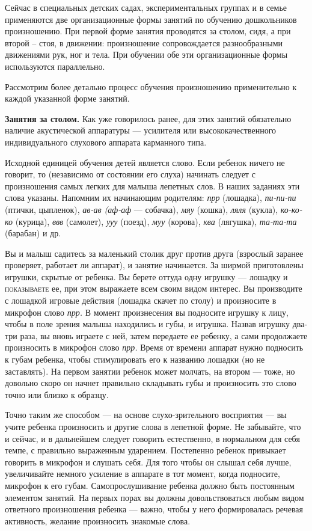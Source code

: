 \documentclass{book}
\renewcommand{\emph}[1]{\textit{#1}}
\begin{document}
Сейчас в специальных детских садах, экспериментальных группах и в семье
применяются две организационные формы занятий по обучению дошкольников
произношению. При первой форме занятия проводятся за столом, сидя, а при
второй -- стоя, в движении: произношение сопровождается разнообразными
движениями рук, ног и тела. При обучении обе эти организационные формы
используются параллельно.

Рассмотрим более детально процесс обучения произношению применительно к
каждой указанной форме занятий.

\textbf{Занятия за столом.} Как уже говорилось ранее, для этих занятий
обязательно наличие акустической аппаратуры --- усилителя или
высококачественного индивидуального слухового аппарата карманного типа.

Исходной единицей обучения детей является слово. Если ребенок ничего не
говорит, то (независимо от состоянии его слуха) начинать следует с
произношения самых легких для малыша лепетных слов. В наших заданиях эти
слова указаны. Напомним их начинающим родителям: \emph{прр} (лошадка),
\emph{пи-пи-пи} (птички, цыпленок), \emph{ав-ав (аф-аф} --- собачка),
\emph{мяу} (кошка), \emph{ляля} (кукла), \emph{ко-ко-ко} (курица),
\emph{ввв} (самолет), \emph{ууу} (поезд), \emph{муу} (корова),
\emph{ква} (лягушка), \emph{та-та-та} (барабан) и др.

Вы и малыш садитесь за маленький столик друг против друга (взрослый
заранее проверяет, работает ли аппарат), и занятие начинается. За ширмой
приготовлены игрушки, скрытые от ребенка. Вы берете оттуда одну игрушку
--- лошадку и \textsc{показываете} ее, при этом выражаете всем своим
видом интерес. Вы производите с лошадкой игровые действия (лошадка
скачет по столу) и произносите в микрофон слово \emph{прр.} В момент
произнесения вы подносите игрушку к лицу, чтобы в поле зрения малыша
находились и губы, и игрушка. Назвав игрушку два-три раза, вы вновь
играете с ней, затем передаете ее ребенку, а сами продолжаете
произносить в микрофон слово \emph{прр.} Время от времени аппарат нужно
подносить к губам ребенка, чтобы стимулировать его к названию лошадки
(но не заставлять). На первом занятии ребенок может молчать, на втором
--- тоже, но довольно скоро он начнет правильно складывать губы и
произносить это слово точно или близко к образцу.

Точно таким же способом --- на основе слухо-зрительного восприятия ---
вы учите ребенка произносить и другие слова в лепетной форме. Не
забывайте, что и сейчас, и в дальнейшем следует говорить естественно, в
нормальном для себя темпе, с правильно выраженным ударением. Постепенно
ребенок привыкает говорить в микрофон и слушать себя. Для того чтобы он
слышал себя лучше, увеличивайте немного усиление в аппарате в тот
момент, когда подносите, микрофон к его губам. Самопрослушивание ребенка
должно быть постоянным элементом занятий. На первых порах вы должны
довольствоваться любым видом ответного произношения ребенка --- важно,
чтобы у него формировалась речевая активность, желание произносить
знакомые слова.
\end{document}
